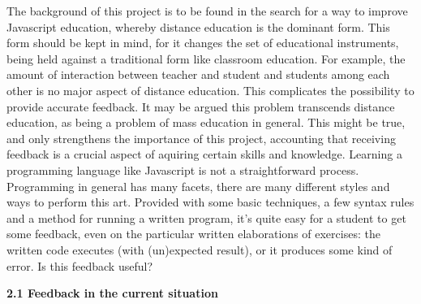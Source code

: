 \documentclass{article}
\begin{document}
\noindent
The background of this project is to be found in the search for a way to improve Javascript education, whereby distance education is the dominant form. This form should be kept in mind, for it changes the set of educational instruments, being held against a traditional form like classroom education. For example, the amount of interaction between teacher and student and students among each other is no major aspect of distance education. This complicates the possibility to provide accurate feedback. It may be argued this problem transcends distance education, as being a problem of mass education in general. This might be true, and only strengthens the importance of this project, accounting that receiving feedback is a crucial aspect of aquiring certain skills and knowledge. 
\newline
Learning a programming language like Javascript is not a straightforward process. Programming in general has many facets, there are many different styles and ways to perform this art. Provided with some basic techniques, a few syntax rules and a method for running a written program, it's quite easy for a student to get some feedback, even on the particular written elaborations of exercises: the written code executes (with (un)expected result), or it produces some kind of error. Is this feedback useful? 

\textbf{2.1 Feedback in the current situation}
\end{document}
